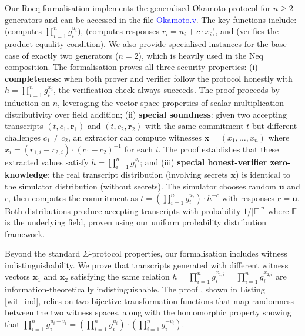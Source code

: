 \documentclass[sigconf, anonymous]{acmart}
\begin{document}
Our Rocq formalisation implements the generalised Okamoto protocol for $n \geq 2$ generators and can be accessed in the file \href{https://anonymous.4open.science/r/SigmaProtocol-EBA5/src/Crypto/Okamoto.v}{\textcolor{blue}{Okamoto.v}}. The key functions include: \texttt{} (computes $\prod_{i=1}^{n} g_i^{u_i}$), \texttt{} (computes responses $r_i = u_i + c \cdot x_i$), and 
\texttt{} (verifies the product equality condition). We also provide specialised instances for the base case of exactly two generators ($n=2$), which is heavily used in the Neq composition. The formalisation proves all three security properties: (i) \textbf{completeness}: 
when both prover and verifier follow the protocol honestly with $h = \prod_{i=1}^{n} g_i^{x_i}$, 
the verification check always succeeds. The proof proceeds by induction on $n$, leveraging the 
vector space properties of scalar multiplication distributivity over field addition; (ii) \textbf{special soundness}: 
given two accepting transcripts $(t, c_1, \mathbf{r}_1)$ and $(t, c_2, \mathbf{r}_2)$ with 
the same commitment $t$ but different challenges $c_1 \neq c_2$, an extractor can compute 
witnesses $\mathbf{x} = (x_1, \ldots, x_n)$ where 
$x_i = (r_{1,i} - r_{2,i}) \cdot (c_1 - c_2)^{-1}$ for each $i$. The proof establishes that 
these extracted values satisfy $h = \prod_{i=1}^{n} g_i^{x_i}$; and (iii) \textbf{special honest-verifier zero-knowledge}: 
the real transcript distribution (involving secrets $\mathbf{x}$) is identical to the simulator 
distribution (without secrets). The simulator chooses random $\mathbf{u}$ and $c$, then computes 
the commitment as $t = \left(\prod_{i=1}^{n} g_i^{u_i}\right) \cdot h^{-c}$ with responses 
$\mathbf{r} = \mathbf{u}$. Both distributions produce accepting transcripts with probability 
$1/|\mathbb{F}|^n$ where $\mathbb{F}$ is the underlying field, proven using our uniform probability 
distribution framework.


Beyond the standard $\Sigma$-protocol properties, our formalisation includes witness indistinguishability. We prove that transcripts generated with different witness 
vectors $\mathbf{x}_1$ and $\mathbf{x}_2$ satisfying the same relation $h = \prod_{i=1}^{n} g_i^{x_{1,i}} = 
\prod_{i=1}^{n} g_i^{x_{2,i}}$ are information-theoretically indistinguishable. The proof \texttt{}, shown in Listing \ref{wit_ind}, relies on two 
bijective transformation functions that map 
randomness between the two witness spaces, along with the homomorphic property showing that 
$\prod_{i=1}^{n} g_i^{u_i - v_i} = \left(\prod_{i=1}^{n} g_i^{u_i}\right) \cdot 
\left(\prod_{i=1}^{n} g_i^{-v_i}\right)$.
\end{document}
